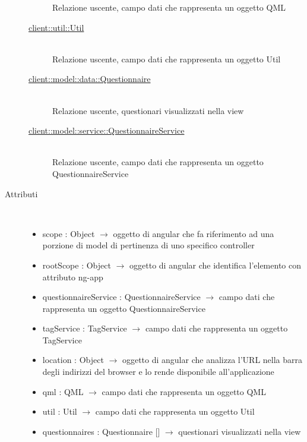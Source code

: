 \begin{description}
\begin{description}
	Relazione uscente, campo dati che rappresenta un oggetto QML
	\item[\hyperlink{client::util::Util}{client::util::Util}] \hfill \\
	Relazione uscente, campo dati che rappresenta un oggetto Util
	\item[\hyperlink{client::model::data::Questionnaire}{client::model::data::Questionnaire}] \hfill \\
	Relazione uscente, questionari visualizzati nella view
	\item[\hyperlink{client::model::service::QuestionnaireService}{client::model::service::QuestionnaireService}] \hfill \\
	Relazione uscente, campo dati che rappresenta un oggetto QuestionnaireService
\end{description}

\item[Attributi] \hfill \\
\vspace{-7mm}
\begin{itemize}
	\item scope : Object $\rightarrow$ oggetto di angular che fa riferimento ad una porzione di model di pertinenza di uno specifico controller
	\item rootScope : Object $\rightarrow$ oggetto di angular che identifica l’elemento con attributo ng-app
	\item questionnaireService : QuestionnaireService $\rightarrow$ campo dati che rappresenta un oggetto QuestionnaireService
	\item tagService : TagService $\rightarrow$ campo dati che rappresenta un oggetto TagService
	\item location : Object $\rightarrow$ oggetto di angular che analizza l'URL nella barra degli indirizzi del browser e lo rende disponibile all'applicazione
	\item qml : QML $\rightarrow$ campo dati che rappresenta un oggetto QML
	\item util : Util $\rightarrow$ campo dati che rappresenta un oggetto Util
	\item questionnaires : Questionnaire [] $\rightarrow$ questionari visualizzati nella view
\end{itemize}


\end{description}
